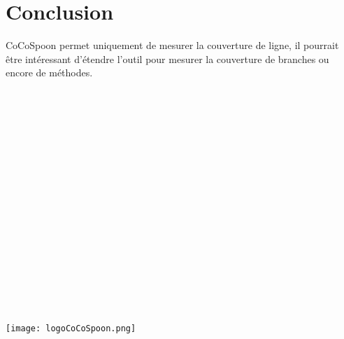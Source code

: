 \chapter*{Conclusion}
	\thispagestyle{conclusion}
	
	
CoCoSpoon permet uniquement de mesurer la couverture de ligne, il pourrait être intéressant d'étendre l'outil pour mesurer la couverture de branches ou encore de méthodes.

~\\
~\\
~\\
~\\
~\\
~\\
~\\
~\\
~\\
~\\
~\\
~\\
~\\
~\\
~\\
~\\
~\\

\centering
\texttt{[image: logoCoCoSpoon.png]}
